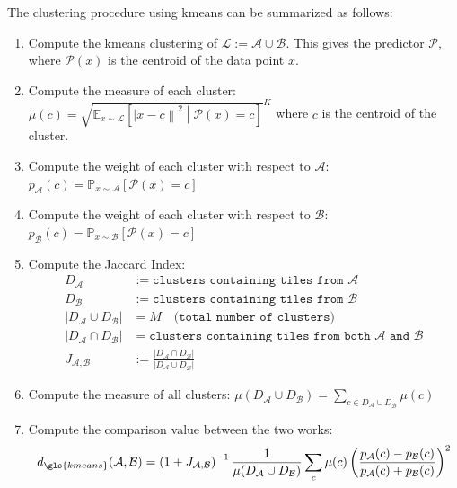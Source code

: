\begin{modified}
\noindent The clustering procedure using \gls{kmeans} can be summarized as follows:
\begin{enumerate}
	\item Compute the \gls{kmeans} clustering of $\mathcal{L}:=\mathcal{A}\cup\mathcal{B}$. This gives the predictor $\mathcal{P}$, where $\mathcal{P}(x)$ is the centroid of the data point $x$.
	\item Compute the measure of each cluster: $\mu(c)=\sqrt{\mathbb{E}_{x\sim\mathcal{L}}\left[\left|x-c\right\|^2\middle| \mathcal{P}(x)=c\right]}^K$ where $c$ is the centroid of the cluster.
	\item Compute the weight of each cluster with respect to $\mathcal{A}$: $p_\mathcal{A}(c)=\mathbb{P}_{x\sim\mathcal{A}}\left[\mathcal{P}(x)=c\right]$
	\item Compute the weight of each cluster with respect to $\mathcal{B}$: $p_\mathcal{B}(c)=\mathbb{P}_{x\sim\mathcal{B}}\left[\mathcal{P}(x)=c\right]$
	\item Compute the Jaccard Index:
	\begin{align*}
		D_\mathcal{A} &:= \texttt{clusters containing tiles from $\mathcal{A}$}\\
		D_\mathcal{B} &:= \texttt{clusters containing tiles from $\mathcal{B}$}\\
		\left|D_\mathcal{A}\cup D_\mathcal{B}\right| &= M \quad \texttt{(total number of clusters)} \\
		\left|D_\mathcal{A}\cap D_\mathcal{B}\right| &= \texttt{clusters containing tiles from both $\mathcal{A}$ and $\mathcal{B}$} \\
		J_{\mathcal{A},\mathcal{B}} &:= \frac{\left|D_\mathcal{A}\cap D_\mathcal{B}\right|}{\left|D_\mathcal{A}\cup D_\mathcal{B}\right|}
	\end{align*}
	\item Compute the measure of all clusters: $\mu(D_\mathcal{A}\cup D_\mathcal{B}) = \sum_{c\in D_\mathcal{A}\cup D_\mathcal{B}} \mu(c)$
	\item Compute the comparison value between the two works:
	\[
		d_{\gls{kmeans}}(\mathcal{A},\mathcal{B}) = \left(1+J_{\mathcal{A},\mathcal{B}}\right)^{-1}\frac{1}{\mu(D_\mathcal{A}\cup D_\mathcal{B})}\sum_c \mu(c)\left(\frac{p_\mathcal{A}(c)-p_\mathcal{B}(c)}{p_\mathcal{A}(c)+p_\mathcal{B}(c)}\right)^2
	\]
\end{enumerate}
\end{modified}

